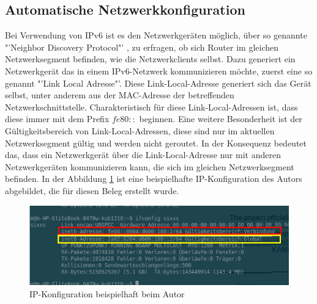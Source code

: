 \documentclass[a4paper,12pt]{scrartcl}
\begin{document}
\subsection{Automatische Netzwerkkonfiguration}
Bei Verwendung von IPv6 ist es den Netzwerkger\"aten m\"oglich, \"uber so genannte "'Neighbor Discovery Protocol"'  \cite[RFC3122]{RFC3122},  \cite[RFC4861]{RFC4861} zu erfragen, ob sich Router im gleichen Netzwerksegment befinden, wie die Netzwerkclients selbst. Dazu generiert ein Netzwerkger\"at das in einem IPv6-Netzwerk kommunizieren m\"ochte, zuerst eine so genannt "'Link Local Adresse"'. Diese Link-Local-Adresse generiert sich das Ger\"at selbst, unter anderem aus der MAC-Adresse der betreffenden Netzwerkschnittstelle. Charakteristisch f\"ur diese Link-Local-Adressen ist, dass diese immer mit dem Prefix $fe80::$ beginnen. Eine weitere Besonderheit ist der G\"ultigkeitsbereich von Link-Local-Adressen, diese sind nur im aktuellen Netzwerksegment g\"ultig und werden nicht geroutet. In der Konsequenz bedeutet das, dass ein Netzwerkger\"at \"uber die Link-Local-Adresse nur mit anderen Netzwerkger\"aten kommunizieren kann, die sich im gleichen Netzwerksegment befinden. In der Abbildung \ref{ifconfig} ist eine beispielhafte IP-Konfiguration des Autors abgebildet, die f\"ur diesen Beleg erstellt wurde.

\begin{figure}[htb]
\begin{center}
 \includegraphics[width=1\hsize]{./images/ifconfig.png}
 \end{center}
\caption[IP-Konfiguration beispielhaft beim Autor, Quelle: Autor,]{
	\label{ifconfig}IP-Konfiguration beispielhaft beim Autor
}
\end{figure}
\end{document}
